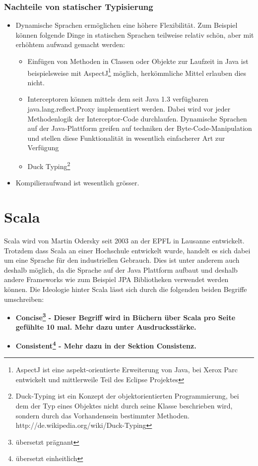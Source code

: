 \subsubsection{Nachteile von statischer Typisierung}
\begin{itemize}
\item Dynamische Sprachen erm\"oglichen eine h\"ohere Flexibilit\"at. Zum Beispiel k\"onnen folgende Dinge in statischen Sprachen teilweise relativ schön, aber mit erhöhtem aufwand gemacht werden:
\begin{itemize}
\item Einf\"ugen von Methoden in Classen oder Objekte zur Laufzeit in Java ist beispielsweise mit AspectJ\footnote{AspectJ ist eine aspekt-orientierte Erweiterung von Java, bei Xerox Parc entwickelt und mittlerweile Teil des Eclipse Projektes} m\"oglich, herkömmliche Mittel erlauben dies nicht.
\item Interceptoren k\"onnen mittels dem seit Java 1.3 verf\"ugbaren java.lang.reflect.Proxy implementiert werden. Dabei wird vor jeder Methodenlogik der Interceptor-Code durchlaufen. Dynamische Sprachen auf der Java-Plattform greifen auf techniken der Byte-Code-Manipulation und stellen diese Funktionalit\"at in wesentlich einfacherer Art zur Verf\"ugung
\item Duck Typing\footnote{Duck-Typing ist ein Konzept der objektorientierten Programmierung, bei dem der Typ eines Objektes nicht durch seine Klasse beschrieben wird, sondern durch das Vorhandensein bestimmter Methoden. http://de.wikipedia.org/wiki/Duck-Typing}
\end{itemize}
\item Kompilieraufwand ist wesentlich gr\"osser.
\end{itemize}


\section{Scala}\label{einarbeitung:scala}
Scala wird von Martin Odersky seit 2003 an der EPFL in Lausanne entwickelt. Trotzdem dass Scala an einer Hochschule entwickelt wurde, handelt es sich dabei um eine Sprache für den industriellen Gebrauch. Dies ist unter anderem auch deshalb m\"oglich, da die Sprache auf der Java Plattform aufbaut und deshalb andere Frameworks wie zum Beispiel JPA Bibliotheken verwendet werden können. Die Ideologie hinter Scala l\"asst sich durch die folgenden beiden Begriffe umschreiben:
\begin{itemize}
\item \bf{Concise\footnote{\"ubersetzt pr\"agnant}} - Dieser Begriff wird in B\"uchern \"uber Scala pro Seite gef\"uhlte 10 mal. Mehr dazu unter Ausdrucksst\"arke.
\item \bf{Consistent\footnote{\"ubersetzt einheitlich}} - Mehr dazu in der Sektion Consistenz.
\end{itemize}


